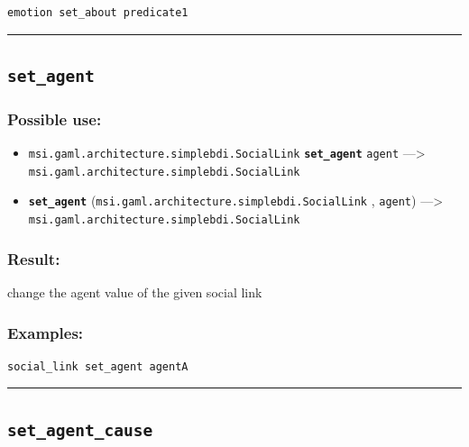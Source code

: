 \documentclass[]{book}
\providecommand{\tightlist}{%
  \setlength{\itemsep}{0pt}\setlength{\parskip}{0pt}}
\theoremstyle{definition}
\theoremstyle{definition}
\theoremstyle{definition}
\theoremstyle{remark}
\begin{document}
\begin{verbatim}
emotion set_about predicate1 
\end{verbatim}

\begin{center}\rule{0.5\linewidth}{\linethickness}\end{center}

\subsection{\texorpdfstring{\texttt{set\_agent}}{set\_agent}}\label{set_agent}

\subsubsection{Possible use:}\label{possible-use-455}

\begin{itemize}
\tightlist
\item
  \texttt{msi.gaml.architecture.simplebdi.SocialLink}
  \textbf{\texttt{set\_agent}} \texttt{agent} ---\textgreater{}
  \texttt{msi.gaml.architecture.simplebdi.SocialLink}
\item
  \textbf{\texttt{set\_agent}}
  (\texttt{msi.gaml.architecture.simplebdi.SocialLink} , \texttt{agent})
  ---\textgreater{} \texttt{msi.gaml.architecture.simplebdi.SocialLink}
\end{itemize}

\subsubsection{Result:}\label{result-439}

change the agent value of the given social link

\subsubsection{Examples:}\label{examples-312}

\begin{verbatim}
social_link set_agent agentA 
\end{verbatim}

\begin{center}\rule{0.5\linewidth}{\linethickness}\end{center}

\subsection{\texorpdfstring{\texttt{set\_agent\_cause}}{set\_agent\_cause}}\label{set_agent_cause}
\end{document}
